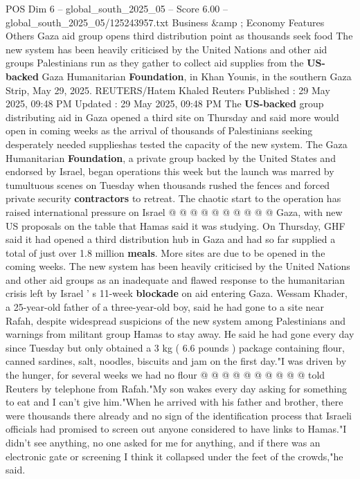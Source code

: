 \begin{textsample}{POS Dim 6 – global\_south\_2025\_05 – Score 6.00 – global\_south\_2025\_05/125243957.txt}  \label{ex:f6_pos_040}
Business \&amp ; Economy Features Others Gaza aid group opens third distribution point as thousands seek food The new system has been heavily criticised by the United Nations and other aid groups Palestinians run as they gather to collect aid supplies from the \textbf{US-backed} Gaza Humanitarian \textbf{Foundation}, in Khan Younis, in the southern Gaza Strip, May 29, 2025.
REUTERS/Hatem Khaled Reuters Published : 29 May 2025, 09:48 PM Updated : 29 May 2025, 09:48 PM The \textbf{US-backed} group distributing aid in Gaza opened a third site on Thursday and said more would open in coming weeks as the arrival of thousands of Palestinians seeking desperately needed supplieshas tested the capacity of the new system.
The Gaza Humanitarian \textbf{Foundation}, a private group backed by the United States and endorsed by Israel, began operations this week but the launch was marred by tumultuous scenes on Tuesday when thousands rushed the fences and forced private security \textbf{contractors} to retreat.
The chaotic start to the operation has raised international pressure on Israel @ @ @ @ @ @ @ @ @ @ Gaza, with new US proposals on the table that Hamas said it was studying.
On Thursday, GHF said it had opened a third distribution hub in Gaza and had so far supplied a total of just over 1.8 million \textbf{meals}.
More sites are due to be opened in the coming weeks.
The new system has been heavily criticised by the United Nations and other aid groups as an inadequate and flawed response to the humanitarian crisis left by Israel ' s 11-week \textbf{blockade} on aid entering Gaza.
Wessam Khader, a 25-year-old father of a three-year-old boy, said he had gone to a site near Rafah, despite widespread suspicions of the new system among Palestinians and warnings from militant group Hamas to stay away.
He said he had gone every day since Tuesday but only obtained a 3 kg ( 6.6 pounds ) package containing flour, canned sardines, salt, noodles, biscuits and jam on the first day."I was driven by the hunger, for several weeks we had no flour @ @ @ @ @ @ @ @ @ @ told Reuters by telephone from Rafah."My son wakes every day asking for something to eat and I can't give him."When he arrived with his father and brother, there were thousands there already and no sign of the identification process that Israeli officials had promised to screen out anyone considered to have links to Hamas."I didn't see anything, no one asked for me for anything, and if there was an electronic gate or screening I think it collapsed under the feet of the crowds,"he said.

\end{textsample}

